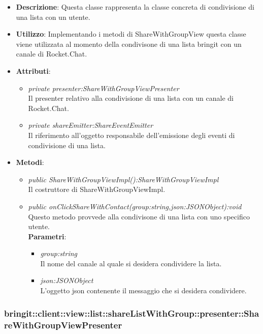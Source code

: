 \begin{itemize}
\item \textbf{Descrizione}: Questa classe rappresenta la classe concreta di condivisione di una lista con un utente.
\item \textbf{Utilizzo}: Implementando i metodi di ShareWithGroupView questa classe viene utilizzata al momento della condivisone di una lista bringit con un canale di Rocket.Chat.
\item \textbf{Attributi}: 
\begin{itemize}
	\item \textit{private presenter:ShareWithGroupViewPresenter}\\
	Il presenter relativo alla condivisione di una lista con un canale di Rocket.Chat.
	\item \textit{private shareEmitter:ShareEventEmitter}\\
	Il riferimento all'oggetto responsabile dell'emissione degli eventi di condivisione di una lista.
\end{itemize}
\item \textbf{Metodi}:
	\begin{itemize}
	\item \textit{public ShareWithGroupViewImpl():ShareWithGroupViewImpl}\\
	Il costruttore di ShareWithGroupViewImpl.
	\item \textit{public onClickShareWithContact(group:string,json:JSONObject):void}\\
	Questo metodo provvede alla condivisone di una lista con uno specifico utente.
					\\ \textbf{Parametri}: \begin{itemize}
			\item \textit{group:string}\\
			Il nome del canale al quale si desidera condividere la lista.
			\item \textit{json:JSONObject}\\
			L'oggetto json contenente il messaggio che si desidera condividere.
					\end{itemize} 
	\end{itemize}
\end{itemize} 

\subsubsection{bringit::client::view::list::shareListWithGroup::presenter::ShareWithGroupViewPresenter}

